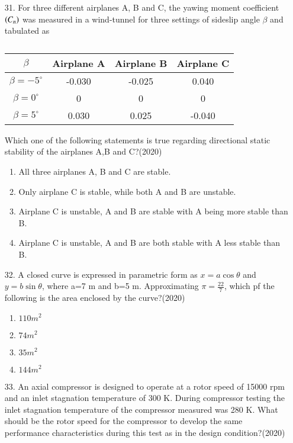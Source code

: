 \documentclass[journal]{IEEEtran}
\begin{document}
\begin{enumerate}
    \item[31.] For three different airplanes A, B and C, the yawing moment coefficient $\left(C_n\right)$ was measured in a wind-tunnel for three settings of sideslip angle $\beta$ and tabulated as
    \begin{table}
        \centering
        \begin{tabular}{|c|c|c|c|}
            \hline
            $\beta$ & Airplane A & Airplane B & Airplane C \\ \hline
            $\beta = -5^\circ$ & -0.030 & -0.025 & 0.040 \\ \hline
            $\beta = 0^\circ$ & 0 & 0 & 0 \\ \hline
            $\beta = 5^\circ$ & 0.030 & 0.025 & -0.040 \\ \hline
        \end{tabular}  %
        \caption{}
    \end{table}
    Which one of the following statements is true regarding directional static stability of the airplanes A,B and C?\hfill (2020)
    \begin{enumerate}[label=(\Alph*)]
        \item All three airplanes A, B and C are stable.
        \item Only airplane C is stable, while both A and B are unstable.
        \item Airplane C is unstable, A and B are stable with A being more stable than B.
        \item Airplane C is unstable, A and B are both stable with A less stable than B.
    \end{enumerate}
    \item[32.] A closed curve is expressed in parametric form as $x =a\cos\theta$ and $y=b\sin\theta$, where a=7 m and b=5 m. Approximating $\pi = \frac{22}{7}$, which pf the following is the area enclosed by the curve?\hfill (2020)
    \begin{enumerate}[label=(\Alph*)]
        \item $110 m^2$
        \item $74 m^2$
        \item $35 m^2$
        \item $144 m^2$
    \end{enumerate}
    \item[33.] An axial compressor is designed to operate at a rotor speed of 15000 rpm and an inlet stagnation temperature of 300 K. During compressor testing the inlet stagnation temperature of the compressor  measured was 280 K. What should be the rotor speed for the compressor to develop the same performance characteristics during this test as in the design condition?\hfill (2020)

\end{enumerate}
\end{document}
